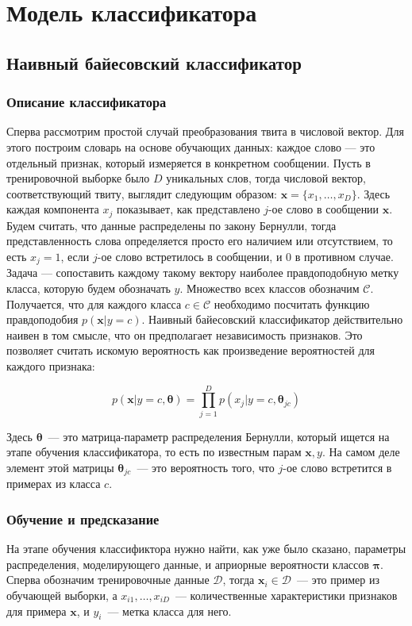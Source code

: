 \section{Модель классификатора}
\subsection{Наивный байесовский классификатор}
\subsubsection{Описание классификатора}
Сперва рассмотрим простой случай преобразования твита в числовой вектор. Для этого построим словарь
на основе обучающих данных: каждое слово --- это отдельный признак,
который измеряется в конкретном сообщении. Пусть в тренировочной выборке было $D$ уникальных слов,
тогда числовой вектор, соответствующий твиту, выглядит следующим образом:
$\mathbf{x} = \{x_1,\ldots,x_D \}$. Здесь каждая компонента $x_j$ показывает, как представлено
$j$-ое слово в сообщении $\mathbf{x}$. Будем считать, что данные распределены по закону Бернулли, тогда
представленность слова определяется просто его наличием или отсутствием, то есть $x_j = 1$, если
$j$-ое слово встретилось в сообщении, и $0$ в противном случае. Задача --- сопоставить каждому такому
вектору наиболее правдоподобную метку класса, которую будем обозначать $y$. Множество всех классов
обозначим $\mathcal{C}$. Получается, что для каждого класса $c \in \mathcal{C}$ необходимо посчитать
функцию правдоподобия $p(\mathbf{x}|y=c)$. Наивный байесовский классификатор действительно наивен в
том смысле, что он предполагает независимость признаков. Это позволяет считать искомую вероятность
как произведение вероятностей для каждого признака:

\begin{equation}
  p(\mathbf{x}|y=c,\mathbf{\theta}) = \prod_{j=1}^Dp(x_j|y=c,\mathbf{\theta}_{jc})
  \label{eq:nbprob}
\end{equation}

Здесь $\mathbf{\theta}$~--- это матрица-параметр распределения Бернулли, который ищется на этапе
обучения классификатора, то есть по известным парам $\mathbf{x}, y$. На самом деле элемент этой
матрицы  $\mathbf{\theta}_{jc}$~--- это вероятность того, что $j$-ое слово встретится в примерах из класса $c$.


\subsubsection{Обучение и предсказание}
На этапе обучения классификтора нужно найти, как уже было сказано, параметры распределения,
моделирующего данные, и априорные вероятности классов $\mathbf{\pi}$. Сперва обозначим тренировочные
данные $\mathcal{D}$, тогда $\mathbf{x}_i \in \mathcal{D}$~--- это пример из обучающей выборки, а
$x_{i1},\ldots,x_{iD}$~--- количественные характеристики признаков для примера $\mathbf{x}$, и $y_i$~--- метка класса для него.

